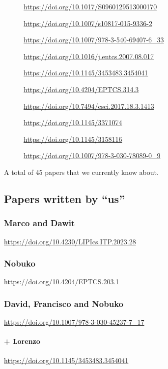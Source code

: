 \begin{description}
\item[\cite{Parrow2014}]                  \url{https://doi.org/10.1017/S0960129513000170}
\item[\cite{Bengtson2016}]                \url{https://doi.org/10.1007/s10817-015-9336-2}
\item[\cite{Kahsai2008}]                  \url{https://doi.org/10.1007/978-3-540-69407-6_33}
\item[\cite{Bengtson2007}]                \url{https://doi.org/10.1016/j.entcs.2007.08.017}
\item[\cite{Castro-Perez2021}]            \url{https://doi.org/10.1145/3453483.3454041}
\item[\cite{Gay2020}]                     \url{https://doi.org/10.4204/EPTCS.314.3}
\item[\cite{Brady2017}]                   \url{https://doi.org/10.7494/csci.2017.18.3.1413}
\item[\cite{Hinrichsen2019}]              \url{https://doi.org/10.1145/3371074}
\item[\cite{Sergey2017}]                  \url{https://doi.org/10.1145/3158116}
\item[\cite{DBLP:conf/forte/ZalakainD21}] \url{https://doi.org/10.1007/978-3-030-78089-0_9}
\end{description}

A total of 45 papers that we currently know about.

\subsection{Papers written by ``us''}
\subsubsection{Marco and Dawit}
\cite{Tirore:2023} \url{https://doi.org/10.4230/LIPIcs.ITP.2023.28}

\subsubsection{Nobuko}
\cite{Orchard2016} \url{https://doi.org/10.4204/EPTCS.203.1}

\subsubsection{David, Francisco and Nobuko}
\cite{Castro2020} \url{https://doi.org/10.1007/978-3-030-45237-7_17}

\paragraph{+ Lorenzo}
\cite{Castro-Perez2021} \url{https://doi.org/10.1145/3453483.3454041}

